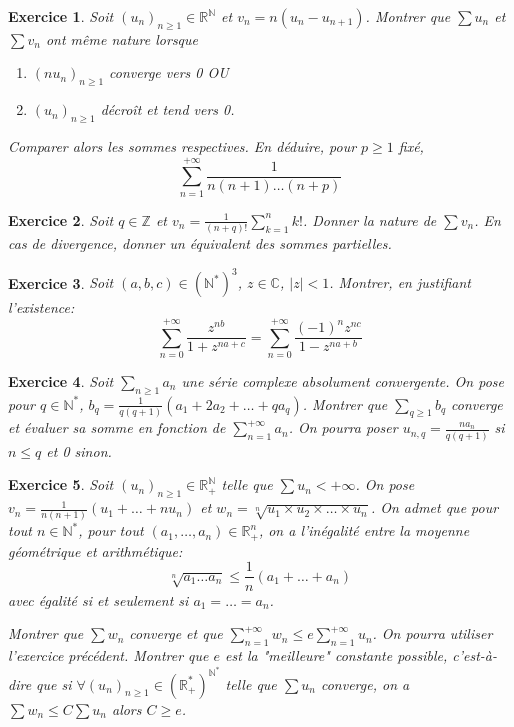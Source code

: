 \documentclass[12pt]{article}
\newtheorem{exercise}{Exercice}[section]
\theoremstyle{remark}
\theoremstyle{remark}
\newcommand{\R}{\mathbb{R}}
\newcommand{\C}{\mathbb{C}}
\newcommand{\N}{\mathbb{N}}
\newcommand{\Z}{\mathbb{Z}}
\begin{document}
\begin{exercise}
	Soit $(u_{n})_{n\geqslant1}\in\R^{\N}$ et $v_{n}=n(u_{n}-u_{n+1})$. Montrer
	que $\sum u_{n}$ et $\sum v_{n}$ ont même nature lorsque
	\begin{enumerate}
		\item [(i)] $(nu_{n})_{n\geqslant1}$ converge vers 0 OU
		\item [(ii)] $(u_{n})_{n\geqslant 1}$ décroît et tend vers 0.
	\end{enumerate}
	Comparer alors les sommes respectives. En déduire, pour $p\geqslant1$ fixé,
	$$\sum_{n=1}^{+\infty}\frac{1}{n(n+1)\dots(n+p)}$$
\end{exercise}

\begin{exercise}
	Soit $q\in\Z$ et $v_{n}=\frac{1}{(n+q)!}\sum_{k=1}^{n}k!$. Donner la nature
	de $\sum v_{n}$. En cas de divergence, donner un équivalent des sommes partielles.
\end{exercise}

\begin{exercise}
	Soit $(a,b,c)\in (\N^{*})^{3}$, $z\in\C$, $\vert z\vert<1$. Montrer, en
	justifiant l'existence:
	$$\sum_{n=0}^{+\infty}\frac{z^{nb}}{1+z^{na+c}}=\sum_{n=0}^{+\infty}\frac{(-1)^{n}z^{nc}}{1-z^{na+b}}$$
\end{exercise}

\begin{exercise}
	Soit $\sum_{n\geqslant1} a_{n}$ une série complexe absolument convergente.
	On pose pour $q\in\N^{*}$,
	$b_q=\frac{1}{q(q+1)}(a_{1}+2a_{2}+\dots+qa_{q})$. Montrer que
	$\sum_{q\geqslant1}b_{q}$ converge et évaluer sa somme en fonction de
	$\sum_{n=1}^{+\infty}a_{n}$. On pourra poser $u_{n,q}=\frac{na_{n}}{q(q+1)}$
	si $n\leqslant q$ et 0 sinon.
\end{exercise}

\begin{exercise}
	Soit $(u_{n})_{n\geqslant1}\in\R_{+}^{\N}$ telle que $\sum u_{n}<+\infty$.
	On pose $v_{n}=\frac{1}{n(n+1)}(u_{1}+\dots+nu_{n})$ et
	$w_{n}=\sqrt[n]{u_1\times u_2\times\dots\times u_n}$. On admet que pour tout
	$n\in\N^{*}$, pour tout $(a_{1},\dots,a_{n})\in\R_{+}^{n}$, on a l'inégalité
	entre la moyenne géométrique et arithmétique:
	$$\sqrt[n]{a_{1}\dots a_{n}}\leqslant\frac{1}{n}(a_{1}+\dots+a_{n})$$
	avec égalité si et seulement si $a_{1}=\dots=a_{n}$.

	Montrer que $\sum w_{n}$ converge et que $\sum_{n=1}^{+\infty}w_{n}\leqslant
	e\sum_{n=1}^{+\infty}u_{n}$. On pourra utiliser l'exercice précédent.
	Montrer que $e$ est la "meilleure" constante possible, c'est-à-dire que si
	$\forall (u_{n})_{n\geqslant1}\in(\R_{+}^{*})^{\N^{*}}$ telle que $\sum
	u_{n}$ converge, on a $\sum w_{n}\leqslant C\sum u_{n}$ alors $C\geqslant e$.
\end{exercise}
\end{document}
